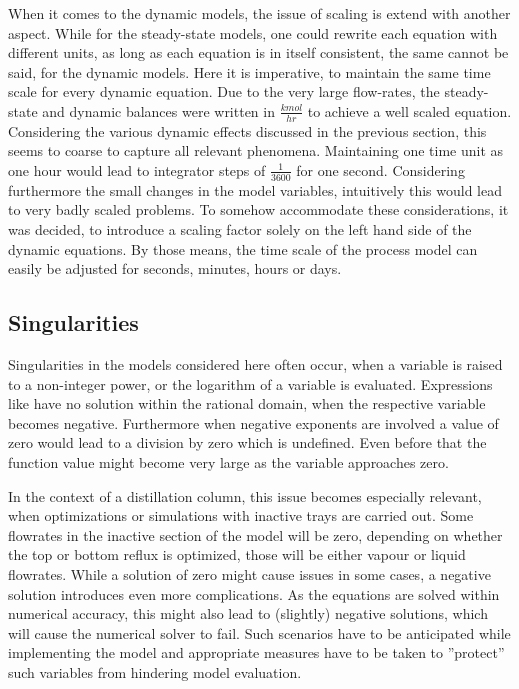         When it comes to the dynamic models, the issue of scaling is extend with another aspect. While for the steady-state
        models, one could rewrite each equation with different units, as long as each equation is in itself consistent,
        the same cannot be said, for the dynamic models. Here it is imperative, to maintain the same time scale for every
        dynamic equation. Due to the very large flow-rates, the steady-state and dynamic balances were written in
        $\frac{kmol}{hr}$ to achieve a well scaled equation. Considering the various dynamic effects discussed in
        the previous section, this seems to coarse to capture all relevant phenomena. Maintaining one time unit as one
        hour would lead to integrator steps of $\frac{1}{3600}$ for one second. Considering furthermore the small changes
        in the model variables, intuitively this would lead to very badly scaled problems. To somehow accommodate these
        considerations, it was decided, to introduce a scaling factor solely on the left hand side of the dynamic equations.
        By those means, the time scale of the process model can easily be adjusted for seconds, minutes, hours or days.

        \subsection{Singularities}
        Singularities in the models considered here often occur, when a variable is raised to a non-integer power,
        or the logarithm of a variable is evaluated.
        Expressions like have no solution within the rational domain, when the respective variable becomes negative.
        Furthermore when negative exponents are involved a value of zero would lead to a division by zero which is
        undefined. Even before that the function value might become very large as the variable approaches zero.

        In the context of a distillation column, this issue becomes especially relevant, when optimizations or simulations
        with inactive trays are carried out. Some flowrates in the inactive section of the model will be zero, depending
        on whether the top or bottom reflux is optimized, those will be either vapour or liquid flowrates. While a
        solution of zero might cause issues in some cases, a negative solution introduces even more complications. As the
        equations are solved within numerical accuracy, this might also lead to (slightly) negative solutions, which will
        cause the numerical solver to fail. Such scenarios have to be anticipated while implementing the model and
        appropriate measures have to be taken to ''protect'' such variables from hindering model evaluation.

